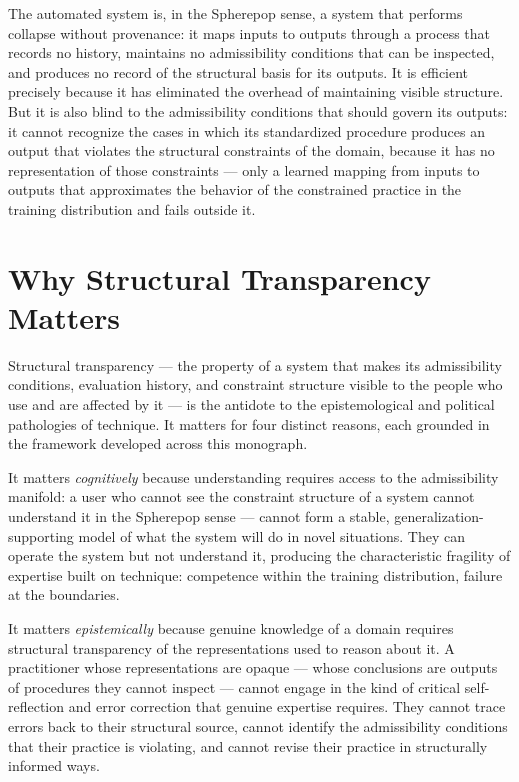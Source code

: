 \documentclass[12pt,openany]{book}
\theoremstyle{plain}
\theoremstyle{definition}
\theoremstyle{remark}
\begin{document}
The automated system is, in the Spherepop sense, a system that performs collapse without provenance: it maps inputs to outputs through a process that records no history, maintains no admissibility conditions that can be inspected, and produces no record of the structural basis for its outputs. It is efficient precisely because it has eliminated the overhead of maintaining visible structure. But it is also blind to the admissibility conditions that should govern its outputs: it cannot recognize the cases in which its standardized procedure produces an output that violates the structural constraints of the domain, because it has no representation of those constraints — only a learned mapping from inputs to outputs that approximates the behavior of the constrained practice in the training distribution and fails outside it.

\section{Why Structural Transparency Matters}

Structural transparency — the property of a system that makes its admissibility conditions, evaluation history, and constraint structure visible to the people who use and are affected by it — is the antidote to the epistemological and political pathologies of technique. It matters for four distinct reasons, each grounded in the framework developed across this monograph.

It matters \emph{cognitively} because understanding requires access to the admissibility manifold: a user who cannot see the constraint structure of a system cannot understand it in the Spherepop sense — cannot form a stable, generalization-supporting model of what the system will do in novel situations. They can operate the system but not understand it, producing the characteristic fragility of expertise built on technique: competence within the training distribution, failure at the boundaries.

It matters \emph{epistemically} because genuine knowledge of a domain requires structural transparency of the representations used to reason about it. A practitioner whose representations are opaque — whose conclusions are outputs of procedures they cannot inspect — cannot engage in the kind of critical self-reflection and error correction that genuine expertise requires. They cannot trace errors back to their structural source, cannot identify the admissibility conditions that their practice is violating, and cannot revise their practice in structurally informed ways.
\end{document}
